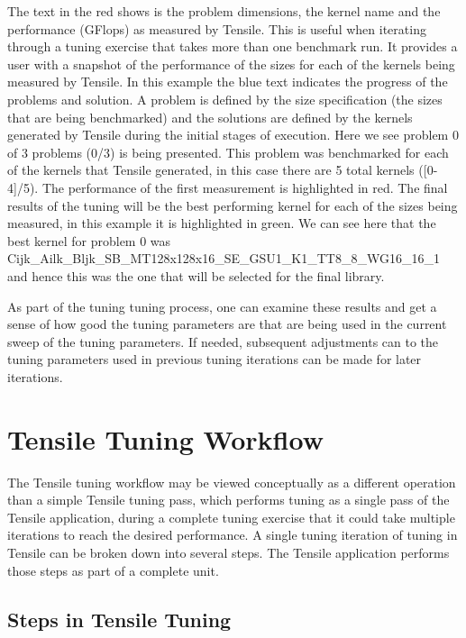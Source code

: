 \documentclass[]{article}
\begin{document}
The text in the red shows is the problem dimensions, the kernel name and the performance (GFlops) as measured by Tensile. This is useful when iterating through a tuning exercise that takes more than one benchmark run. It provides a user with a snapshot of the performance of the sizes for each of the kernels being measured by Tensile. In this example the blue text indicates the progress of the problems and solution. A problem is defined by the size specification (the sizes that are being benchmarked) and the solutions are defined by the kernels generated by Tensile during the initial stages of execution. Here we see problem 0 of 3 problems (0/3) is being presented. This problem was benchmarked for each of the kernels that Tensile generated, in this case there are 5 total kernels ([0-4]/5). The performance of the first measurement is highlighted in red. The final results of the tuning will be the best performing kernel for each of the sizes being measured, in this example it is highlighted in green. We can see here that the best kernel for problem 0 was Cijk\_Ailk\_Bljk\_SB\_MT128x128x16\_SE\_GSU1\_K1\_TT8\_8\_WG16\_16\_1 and hence this was the one that will be selected for the final library.

As part of the tuning tuning process, one can examine these results and get a sense of how good the tuning parameters are that are being used in the current sweep of the tuning parameters. If needed, subsequent adjustments can to the tuning parameters used in previous tuning iterations can be made for later iterations.

\section{Tensile Tuning Workflow}

The Tensile tuning workflow may be viewed conceptually as a different operation than a simple Tensile tuning pass, which performs tuning as a single pass of the Tensile application, during a complete tuning exercise that it could take multiple iterations to reach the desired performance. A single tuning iteration of tuning in Tensile can be broken down into several steps. The Tensile application performs those steps as part of a complete unit.

\subsection{Steps in Tensile Tuning}
\end{document}
